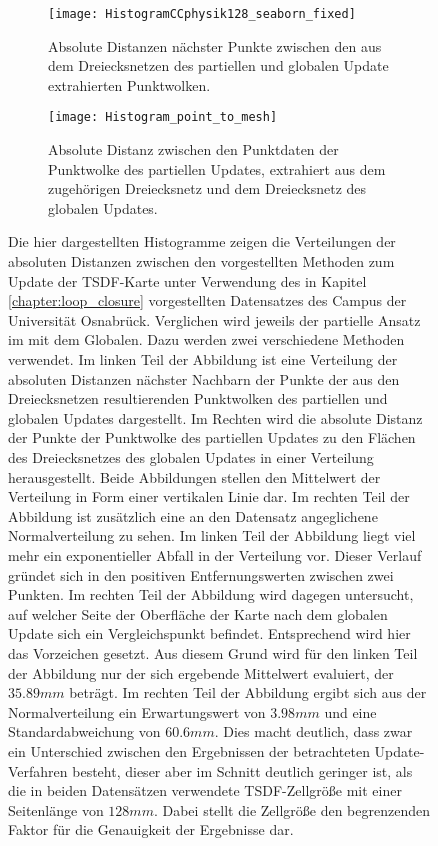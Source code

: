 \begin{figure}
	\centering
	\begin{subfigure}{.5\textwidth}
		 \centering
  		 \texttt{[image: HistogramCCphysik128\_seaborn\_fixed]}
  		 \centering \caption{Absolute Distanzen nächster Punkte zwischen den aus dem Dreiecksnetzen des partiellen und globalen Update extrahierten Punktwolken.}
  		 \label{fig:HistogramCCphysik128_seaborn}
	\end{subfigure}%
	\begin{subfigure}{.5\textwidth}
    	\centering
  		\texttt{[image: Histogram\_point\_to\_mesh]}
  		\centering \caption{Absolute Distanz zwischen den Punktdaten der Punktwolke des partiellen Updates, extrahiert aus dem zugehörigen Dreiecksnetz und dem Dreiecksnetz des globalen Updates.}
  		\label{fig:Histogram_point_to_mesh}
	\end{subfigure}
	\caption{Die hier dargestellten Histogramme zeigen die Verteilungen der absoluten Distanzen zwischen den vorgestellten Methoden zum Update der TSDF-Karte unter Verwendung des in Kapitel \ref{chapter:loop_closure} vorgestellten Datensatzes des Campus der Universität Osnabrück. Verglichen wird jeweils der partielle Ansatz im mit dem Globalen. Dazu werden zwei verschiedene Methoden verwendet. Im linken Teil der Abbildung ist eine Verteilung der absoluten Distanzen nächster Nachbarn der Punkte der aus den Dreiecksnetzen resultierenden Punktwolken des partiellen und globalen Updates dargestellt. Im Rechten wird die absolute Distanz der Punkte der Punktwolke des partiellen Updates zu den Flächen des Dreiecksnetzes des globalen Updates in einer Verteilung herausgestellt. Beide Abbildungen stellen den Mittelwert der Verteilung in Form einer vertikalen Linie dar. Im rechten Teil der Abbildung ist zusätzlich eine an den Datensatz angeglichene Normalverteilung zu sehen. Im linken Teil der Abbildung liegt viel mehr ein exponentieller Abfall in der Verteilung vor. Dieser Verlauf gründet sich in den positiven Entfernungswerten zwischen zwei Punkten. Im rechten Teil der Abbildung wird dagegen untersucht, auf welcher Seite der Oberfläche der Karte nach dem globalen Update sich ein Vergleichspunkt befindet. Entsprechend wird hier das Vorzeichen gesetzt. Aus diesem Grund wird für den linken Teil der Abbildung nur der sich ergebende Mittelwert evaluiert, der $35.89mm$ beträgt. Im rechten Teil der Abbildung ergibt sich aus der Normalverteilung ein Erwartungswert von $3.98mm$ und eine Standardabweichung von $60.6mm$. Dies macht deutlich, dass zwar ein Unterschied zwischen den Ergebnissen der betrachteten Update-Verfahren besteht, dieser aber im Schnitt deutlich geringer ist, als die in beiden Datensätzen verwendete TSDF-Zellgröße mit einer Seitenlänge von $128mm$. Dabei stellt die Zellgröße den begrenzenden Faktor für die Genauigkeit der Ergebnisse dar.}
	\label{fig:CloudDifferences1}
\end{figure}



